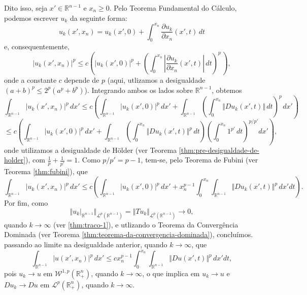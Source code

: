 \documentclass[a4paper, 11pt]{book}
\theoremstyle{definition}
\newcommand{\bR}{\mathbb{R}}
\newcommand{\cL}{\mathcal{L}}
\newcommand{\cW}{\mathcal{W}}
\begin{document}
\begin{prf}
    Dito isso, seja $x' \in \bR^{n-1}$ e $x_n \geqslant 0$.
    Pelo Teorema Fundamental do Cálculo, podemos escrever $u_k$ da seguinte forma:
    \[
        u_k(x'\!,x_n) = u_k(x'\!,0) + \int_0^{x_n} \dfrac{\partial u_k}{\partial x_n} (x'\!,t) \,dt
    \]
    e, consequentemente,
    \[
        |u_k(x'\!,x_n)|^p \leqslant c \left(  |u_k(x'\!,0)|^p + \left(  \int_0^{x_n} \left|\dfrac{\partial u_k}{\partial x_n} (x'\!,t)\right| \,dt\right)^{\!p\,} \right),
    \]
    onde a constante $c$ depende de $p$ (aqui, utlizamos a desigualdade $(a + b)^p \leqslant 2^p (a^p + b^p)$). Integrando ambos os lados sobre $\bR^{n-1}$, obtemos
    \[
        \int_{\bR^{n-1}} |u_k(x',x_n)|^p \,dx' \leqslant c \left( \int_{\bR^{n-1}} |u_k(x',0)|^p \,dx' + \int_{\bR^{n-1}} \left(  \int_0^{x_n} \Vert Du_k(x',t) \Vert \,dt\right)^{\!p\,} dx' \right)
    \]
    \[
        \leqslant  c \left( \int_{\bR^{n-1}} |u_k(x',0)|^p \,dx' + \int_{\bR^{n-1}} \left( \int_0^{x_n} \Vert Du_k (x',t) \Vert^p \,dt \right)\left( \int_0^{x_n} 1^{p'} \,dt \right)^{p/p'} dx'\right),
    \]
    onde utilizamos a desigualdade de Hölder (ver Teorema \ref{thm:pre-desigualdade-de-holder}), com $\frac{1}{p}+ \frac{1}{p'} = 1$.
    Como $p/p' = p-1$, tem-se, pelo Teorema de Fubini (ver Teorema \ref{thm:fubini}), que
    \[
        \int_{\bR^{n-1}} |u_k(x',x_n)|^p \,dx' \leqslant c \left( \int_{\bR^{n-1}} |u_k(x',0)|^p \,dx' + x_n^{p-1} \int_{0}^{x_n} \int_{\bR^{n-1}} \Vert Du_k (x',t) \Vert^p  \,dx'dt \right).
    \]
    Por fim, como
    \[
        \Vert u_k |_{\bR^{n-1}} \Vert_{\cL^p(\bR^{n-1})} = \Vert Tu_k \Vert_{\cL^p(\bR^{n-1})} \to 0,
    \]
    quando $k \to \infty$ (ver \ref{thm:traco-1}), e utlizando o Teorema da Convergência Dominada (ver Teorema \ref{thm:teorema-da-convergencia-dominada}), concluímos. passando ao limite na desigualdade anterior, quando $k \to \infty$, que
    \begin{equation} \label{eq:uuuuu}
        \int_{\bR^{n-1}} |u(x',x_n)|^p \,dx' \leqslant  c x_n^{p-1}\int_0^{x_n} \int_{\bR^{n-1}} \Vert Du(x',t) \Vert^p \,dx'dt,
    \end{equation}
    pois $u_k \to u$ em $\cW^{1,p}(\bR^n_+)$, quando $k \to \infty$, o que implica em $u_k \to u$ e $Du_k \to Du$ em $\cL^p(\bR^n_+)$, quando $k \to \infty$.
    
    \begin{figure}
        \centering
\end{figure}
\end{prf}
\end{document}

